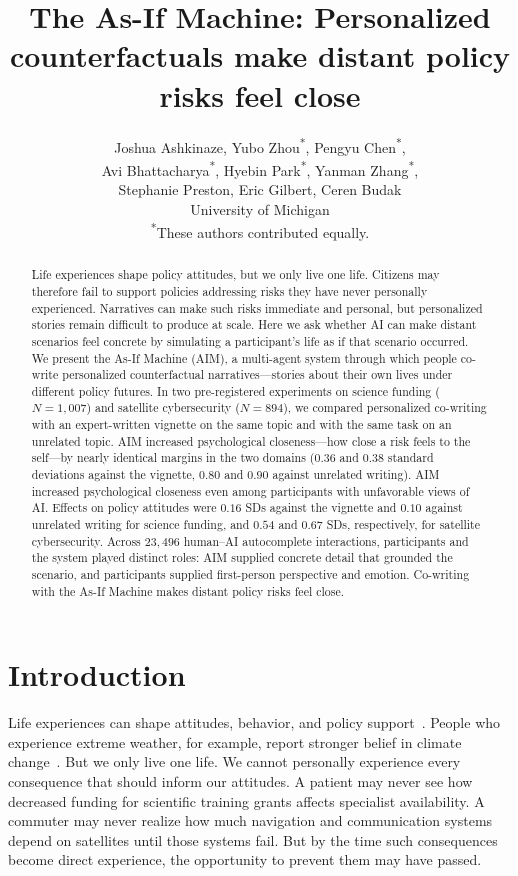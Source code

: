 \documentclass[11pt]{article}
\title{The As-If Machine: Personalized counterfactuals make distant policy risks feel close}
\author{%
\begin{tabular}{c}
Joshua Ashkinaze, Yubo Zhou\textsuperscript{*}, Pengyu Chen\textsuperscript{*},\\
Avi Bhattacharya\textsuperscript{*}, Hyebin Park\textsuperscript{*}, Yanman Zhang\textsuperscript{*},\\
Stephanie Preston, Eric Gilbert, Ceren Budak\\[0.5em]
\small University of Michigan\\[0.3em]
\footnotesize\textsuperscript{*}These authors contributed equally.
\end{tabular}}
\date{}
\begin{document}
\raggedbottom
\maketitle


\begin{abstract}
Life experiences shape policy attitudes, but we only live one life. Citizens may therefore fail to support policies addressing risks they have never personally experienced. Narratives can make such risks immediate and personal, but personalized stories remain difficult to produce at scale. Here we ask whether AI can make distant scenarios feel concrete by simulating a participant's life as if that scenario occurred. We present the As-If Machine (AIM), a multi-agent system through which people co-write personalized counterfactual narratives---stories about their own lives under different policy futures. In two pre-registered experiments on science funding ($N=1{,}007$) and satellite cybersecurity ($N=894$), we compared personalized co-writing with an expert-written vignette on the same topic and with the same task on an unrelated topic. AIM increased psychological closeness---how close a risk feels to the self---by nearly identical margins in the two domains ($0.36$ and $0.38$ standard deviations against the vignette, $0.80$ and $0.90$ against unrelated writing). AIM increased psychological closeness even among participants with unfavorable views of AI. Effects on policy attitudes were $0.16$ SDs against the vignette and $0.10$ against unrelated writing for science funding, and $0.54$ and $0.67$ SDs, respectively, for satellite cybersecurity. Across $23{,}496$ human--AI autocomplete interactions, participants and the system played distinct roles: AIM supplied concrete detail that grounded the scenario, and participants supplied first-person perspective and emotion. Co-writing with the As-If Machine makes distant policy risks feel close.\end{abstract}


\section{Introduction}

Life experiences can shape attitudes, behavior, and policy support~\cite{egan_turning_2012,naumann_how_2016,pud_personal_2004,weinstein_effects_1989}. People who experience extreme weather, for example, report stronger belief in climate change~\cite{egan_turning_2012}. But we only live one life. We cannot personally experience every consequence that should inform our attitudes. A patient may never see how decreased funding for scientific training grants affects specialist availability. A commuter may never realize how much navigation and communication systems depend on satellites until those systems fail. But by the time such consequences become direct experience, the opportunity to prevent them may have passed.
\end{document}
